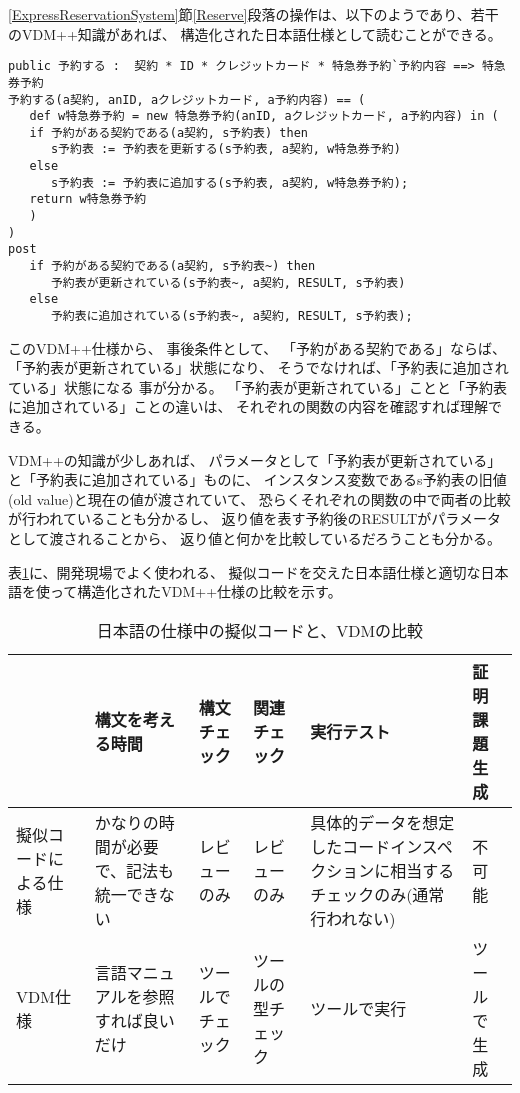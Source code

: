 	\ref{ExpressReservationSystem}節\ref{Reserve}段落の操作は、以下のようであり、若干のVDM++知識があれば、
	構造化された日本語仕様として読むことができる。

\begin{verbatim}
public 予約する :  契約 * ID * クレジットカード * 特急券予約`予約内容 ==> 特急券予約
予約する(a契約, anID, aクレジットカード, a予約内容) == (
   def w特急券予約 = new 特急券予約(anID, aクレジットカード, a予約内容) in (
   if 予約がある契約である(a契約, s予約表) then
      s予約表 := 予約表を更新する(s予約表, a契約, w特急券予約)
   else
      s予約表 := 予約表に追加する(s予約表, a契約, w特急券予約);
   return w特急券予約
   )
)
post
   if 予約がある契約である(a契約, s予約表~) then
      予約表が更新されている(s予約表~, a契約, RESULT, s予約表)
   else
      予約表に追加されている(s予約表~, a契約, RESULT, s予約表);
\end{verbatim}

このVDM++仕様から、
事後条件として、
「予約がある契約である」ならば、「予約表が更新されている」状態になり、
そうでなければ、「予約表に追加されている」状態になる
事が分かる。
「予約表が更新されている」ことと「予約表に追加されている」ことの違いは、
それぞれの関数の内容を確認すれば理解できる。

VDM++の知識が少しあれば、
パラメータとして「予約表が更新されている」と「予約表に追加されている」ものに、
インスタンス変数であるs予約表の旧値(old value)と現在の値が渡されていて、
恐らくそれぞれの関数の中で両者の比較が行われていることも分かるし、
返り値を表す予約後のRESULTがパラメータとして渡されることから、
返り値と何かを比較しているだろうことも分かる。

表\ref{PseudocodeVsVDM}に、開発現場でよく使われる、
擬似コードを交えた日本語仕様と適切な日本語を使って構造化されたVDM++仕様の比較を示す。

\begin{table}[h]
	\caption[日本語の仕様中の擬似コードと、VDMの比較]{日本語の仕様中の擬似コードと、VDMの比較}
	\label{PseudocodeVsVDM}
	\begin{center}
		\setlength{\tabcolsep}{3pt}
		\begin{tabular}{|p{}|p{}|p{}|p{}|p{}|p{}|} \hline
			 & 構文を考える時間 & 構文チェック & 関連チェック & 実行テスト & 証明課題生成  \\ \hline\hline
			擬似コードによる仕様  & かなりの時間が必要で、記法も統一できない & レビューのみ & レビューのみ & 
				具体的データを想定したコードインスペクションに相当するチェックのみ(通常行われない) & 不可能 \\ \hline
			VDM仕様  & 言語マニュアルを参照すれば良いだけ & ツールでチェック & ツールの型チェック & 
				ツールで実行 & ツールで生成 \\ \hline
		\end{tabular}
	\end{center}
\end{table}


